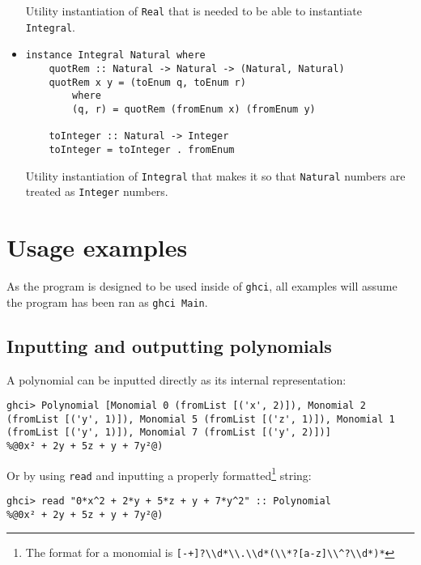 \documentclass[11pt,a4paper]{article}
\begin{document}
\begin{itemize}
    Utility instantiation of \lstinline{Real} that is needed to be able to instantiate \lstinline{Integral}.

    \item \begin{lstlisting}
instance Integral Natural where
    quotRem :: Natural -> Natural -> (Natural, Natural)
    quotRem x y = (toEnum q, toEnum r)
        where
        (q, r) = quotRem (fromEnum x) (fromEnum y)
    
    toInteger :: Natural -> Integer
    toInteger = toInteger . fromEnum      
    \end{lstlisting}

    Utility instantiation of \lstinline{Integral} that makes it so that \lstinline{Natural} numbers are treated as \lstinline{Integer} numbers.

\end{itemize}

\section{Usage examples}

As the program is designed to be used inside of \lstinline{ghci}, all examples will assume the program has been ran as \lstinline{ghci Main}.

\subsection{Inputting and outputting polynomials}

A polynomial can be inputted directly as its internal representation:

\begin{lstlisting}
ghci> Polynomial [Monomial 0 (fromList [('x', 2)]), Monomial 2 (fromList [('y', 1)]), Monomial 5 (fromList [('z', 1)]), Monomial 1 (fromList [('y', 1)]), Monomial 7 (fromList [('y', 2)])]
%@0x² + 2y + 5z + y + 7y²@)
\end{lstlisting}

Or by using \lstinline{read} and inputting a properly formatted\footnote{The format for a monomial is \lstinline{[-+]?\\d*\\.\\d*(\\*?[a-z]\\^?\\d*)*}} string:

\begin{lstlisting}
ghci> read "0*x^2 + 2*y + 5*z + y + 7*y^2" :: Polynomial
%@0x² + 2y + 5z + y + 7y²@)
\end{lstlisting}
\end{document}
